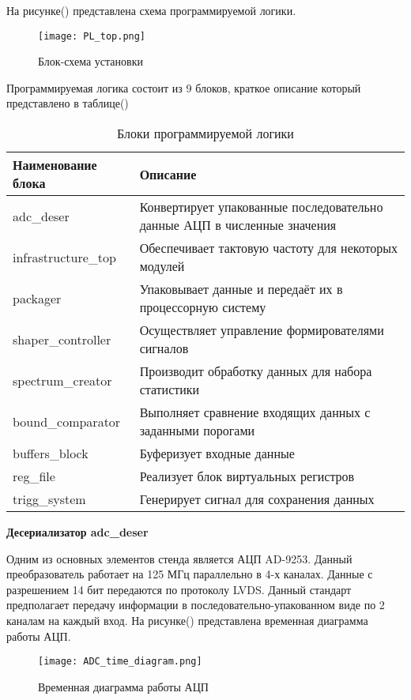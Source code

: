 На рисунке() представлена схема программируемой логики.\par 
\begin{figure}[ht]
    \centering
    \texttt{[image: PL\_top.png]}
    \caption{Блок-схема установки}
    \label{fig:mpr}
\end{figure}
Программируемая логика состоит из 9 блоков, краткое описание который представлено в таблице()\par
\begin{table}[h!]
    \caption{Блоки программируемой логики}
    \begin{tabular}{|p{}|p{}|}
        \hline
        Наименование блока & Описание \\
        \hline
        adc\_deser & Конвертирует упакованные последовательно данные АЦП в численные значения \\
        \hline
        infrastructure\_top & Обеспечивает тактовую частоту для некоторых модулей \\
        \hline
        packager & Упаковывает данные и передаёт их в процессорную систему \\
        \hline
        shaper\_controller & Осуществляет управление формирователями сигналов \\
        \hline
        spectrum\_creator & Производит обработку данных для набора статистики \\
        \hline
        bound\_comparator & Выполняет сравнение входящих данных с заданными порогами \\
        \hline
        buffers\_block & Буферизует входные данные \\
        \hline
        reg\_file & Реализует блок виртуальных регистров \\
        \hline
        trigg\_system & Генерирует сигнал для сохранения данных \\
        \hline
    \end{tabular}
\end{table}
\textbf{Десериализатор adc\_deser}\par
Одним из основных элементов стенда является АЦП AD-9253. Данный преобразователь работает на 125 МГц параллельно в 4-х каналах. Данные с разрешением 14 бит передаются по протоколу LVDS. Данный стандарт предполагает передачу информации в последовательно-упакованном виде по 2 каналам на каждый вход. На рисунке() представлена временная диаграмма работы АЦП.\par
\begin{figure}[ht]
    \centering
    \texttt{[image: ADC\_time\_diagram.png]}
    \caption{Временная диаграмма работы АЦП}
    \label{fig:mpr}
\end{figure}
